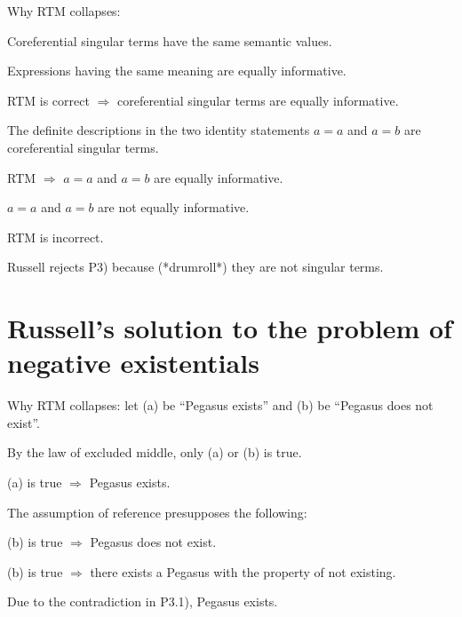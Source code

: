 Why RTM collapses:

\begin{argument}\leavevmode
\begin{premises}
  \item[P1)] Coreferential singular terms have the same semantic values.
  \item[P2)] Expressions having the same meaning are equally informative.
  \item[C1)] RTM is correct $\Rightarrow$ coreferential singular terms are equally informative.
  \item[P3)] The definite descriptions in the two identity statements $a = a$ and $a = b$ are coreferential singular terms.
  \item[C2)] RTM $\Rightarrow$ $a = a$ and $a = b$ are equally informative.
  \item[P4)] $a = a$ and $a = b$ are not equally informative.
  \item[C3)] RTM is incorrect.
\end{premises}
\end{argument}

Russell rejects P3) because (*drumroll*) they are not singular terms.

\section{Russell's solution to the problem of negative existentials}

Why RTM collapses: let (a) be ``Pegasus exists'' and (b) be ``Pegasus does not exist''.

\begin{argument}\leavevmode
\begin{premises}
  \item[P1)] By the law of excluded middle, only (a) or (b) is true.
  \item[P2)] (a) is true $\Rightarrow$ Pegasus exists.
  \item[P3.0)] The assumption of reference presupposes the following:
  \begin{premises}
    \item[P3)] (b) is true $\Rightarrow$ Pegasus does not exist.
    \item[P3.1)] (b) is true $\Rightarrow$ there exists a Pegasus with the property of not existing.
  \end{premises}
  \item[C1)] Due to the contradiction in P3.1), Pegasus exists.
\end{premises}
\end{argument}


